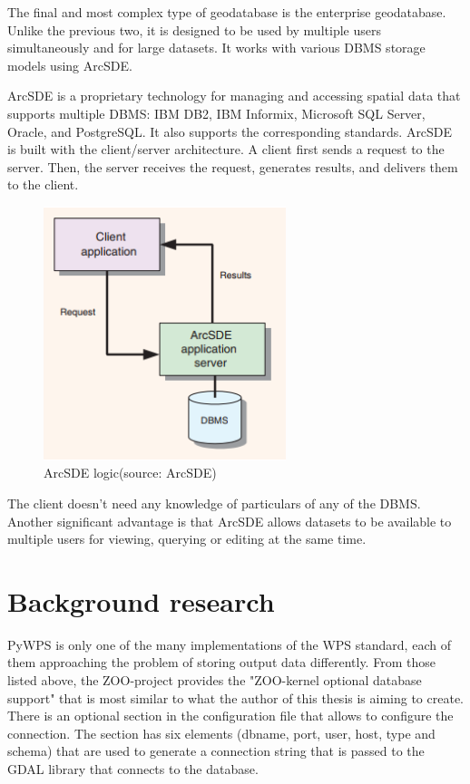 The final and most complex type of geodatabase is the enterprise geodatabase. Unlike the previous two, it is designed to be used by multiple users simultaneously and for large datasets. It works with various DBMS storage models using ArcSDE. 

ArcSDE is a proprietary technology for managing and accessing spatial data that supports multiple DBMS: IBM DB2, IBM Informix, Microsoft SQL Server, Oracle, and PostgreSQL.\cite{arcsdedoc}  It also supports the corresponding standards. ArcSDE is built with the client/server architecture. A client first sends a request to the server. Then, the server receives the request, generates results, and delivers them to the client.

\begin{figure}[H] \centering
      \includegraphics[width=200pt]{./pictures/arcsdeobr.png}
      \caption[ArcSDE logic]{ArcSDE logic(source: ArcSDE)}
      \label{fig:ArcSDE logic}
  \end{figure}

The client doesn't need any knowledge of particulars of any of the DBMS. Another significant advantage is that ArcSDE allows datasets to be available to multiple users for viewing, querying or editing at the same time.\cite{esritypes}

\section{Background research}


PyWPS is only one of the many implementations of the WPS standard, each of them approaching the problem of storing output data differently. From those listed above, the ZOO-project provides the "ZOO-kernel optional database support" \cite{zoodb} that is most similar to what the author of this thesis is aiming to create. There is an optional section in the configuration file that allows to configure the connection. The section has six elements (dbname, port, user, host, type and schema) that are used to generate a connection string that is passed to the GDAL library that connects to the database.\cite{zoodbsec} 


